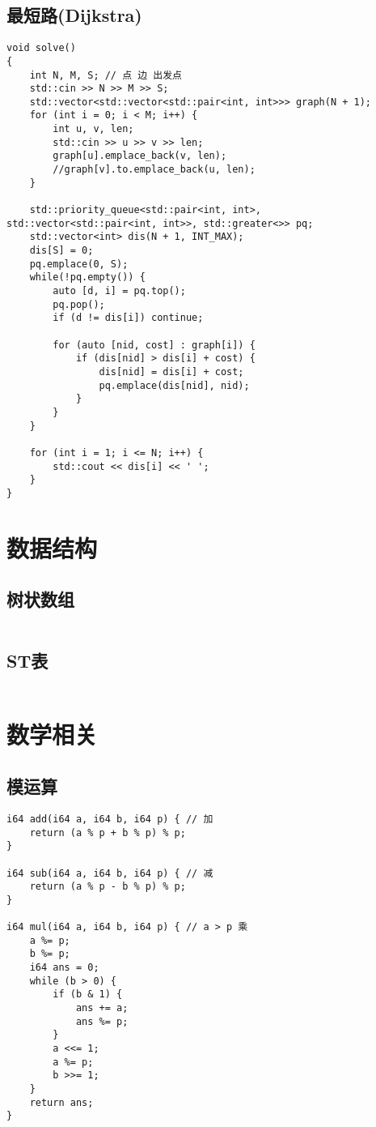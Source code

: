 \documentclass[a4paper, 10pt]{paper}
\newcommand{\cpp}[1]{\inputminted[frame=single, linenos=true]{cpp}{#1}}
\begin{document}
        \subsection{最短路(Dijkstra)}
        \begin{verbatim}
void solve()
{
    int N, M, S; // 点 边 出发点
    std::cin >> N >> M >> S;
    std::vector<std::vector<std::pair<int, int>>> graph(N + 1);
    for (int i = 0; i < M; i++) {
        int u, v, len;
        std::cin >> u >> v >> len;
        graph[u].emplace_back(v, len);
        //graph[v].to.emplace_back(u, len);
    }

    std::priority_queue<std::pair<int, int>, std::vector<std::pair<int, int>>, std::greater<>> pq;
    std::vector<int> dis(N + 1, INT_MAX);
    dis[S] = 0;
    pq.emplace(0, S);
    while(!pq.empty()) {
        auto [d, i] = pq.top();
        pq.pop();
        if (d != dis[i]) continue;

        for (auto [nid, cost] : graph[i]) {
            if (dis[nid] > dis[i] + cost) {
                dis[nid] = dis[i] + cost;
                pq.emplace(dis[nid], nid);
            }
        }
    }

    for (int i = 1; i <= N; i++) {
        std::cout << dis[i] << ' ';
    }
}
        \end{verbatim}
        
    \section{数据结构}
        \subsection{树状数组}
        \cpp{../tree_array.cpp}

        \subsection{ST表}
        \cpp{../ST.cpp}

    \section{数学相关}
        \subsection{模运算}
        \begin{verbatim}
i64 add(i64 a, i64 b, i64 p) { // 加
    return (a % p + b % p) % p;
}

i64 sub(i64 a, i64 b, i64 p) { // 减
    return (a % p - b % p) % p;
}

i64 mul(i64 a, i64 b, i64 p) { // a > p 乘
    a %= p;
    b %= p;
    i64 ans = 0;
    while (b > 0) {
        if (b & 1) {
            ans += a;
            ans %= p;
        }
        a <<= 1;
        a %= p;
        b >>= 1;
    }
    return ans;
}
        \end{verbatim}
\end{document}
